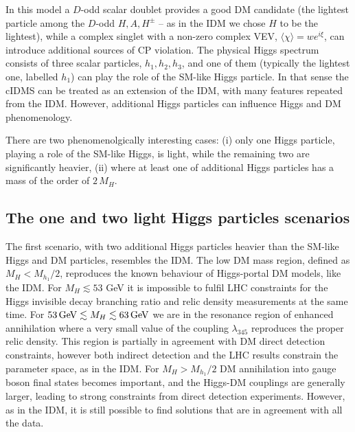 \documentclass{PoS}
\newcommand{\htr}[1]{{\color{red} #1}}
\newcommand{\GeV}{{\ensuremath\rm GeV}}
\begin{document}
{In this model a $D$-odd scalar doublet provides a good DM candidate (the lightest particle among the $D$-odd $H,A,H^\pm$ -- as in the IDM we chose $H$ to be the lightest), while a complex singlet with a non-zero complex VEV, $\langle \chi \rangle = w e^{i\xi}$, can introduce additional sources of CP violation. The physical Higgs spectrum consists of three scalar particles, $h_1,h_2,h_3$, and one of them ({typically the lightest one, {labelled} $h_1$)} can play {the} role of the SM-like Higgs particle. In that sense the cIDMS can be treated as an extension of the IDM, with many features repeated from the IDM. However, additional Higgs particles can influence Higgs and DM phenomenology.

There are two phenomenolgically interesting cases: (i) only one Higgs particle, playing a role of the SM-like Higgs, is light, while the remaining two are significantly heavier, (ii) where at least one of additional Higgs particles has a mass of the order of $2\,M_{H}$.

\subsection{  {The one and two light Higgs particles scenarios }}

The first scenario, with two additional Higgs particles heavier than the SM-like Higgs and DM particles, resembles the IDM. The low DM mass region, defined as $M_{H} < M_{h_1}/2$, reproduces the known behaviour of Higgs-portal DM models, like the IDM. For $M_{H} \lesssim 53$ GeV it is impossible to fulfil LHC constraints for the Higgs invisible decay branching ratio and relic density measurements at the same time. For $53\,\GeV \lesssim M_H \lesssim 63\,\GeV$  we are in the resonance region of enhanced annihilation {where a} very small {value of the} coupling $\lambda_{345}$ {reproduces the} proper relic density. This region is partially in agreement with 
DM direct detection constraints, however both indirect detection and the LHC results {constrain} the parameter space, as in the IDM. For $M_{H} > M_{h_1}/2$ DM annihilation {into gauge boson final states becomes important}, and the Higgs-DM couplings are generally larger, leading to strong constraints from direct detection experiments. However, as in the IDM, it is still possible to find solutions that are in agreement with all the data.


}
\end{document}
